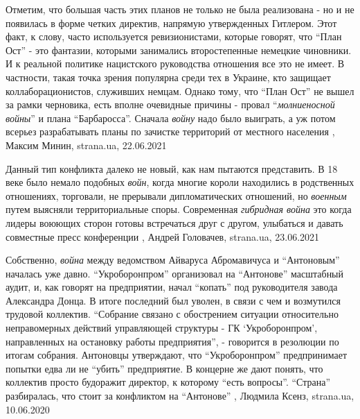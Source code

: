 Отметим, что большая часть этих планов не только не была реализована - но и не
появилась в форме четких директив, напрямую утвержденных Гитлером.  Этот факт,
к слову, часто используется ревизионистами, которые говорят, что \enquote{План Ост} -
это фантазии, которыми занимались второстепенные немецкие чиновники. И к
реальной политике нацистского руководства отношения все это не имеет.  В
частности, такая точка зрения популярна среди тех в Украине, кто защищает
коллаборационистов, служивших немцам.  Однако тому, что \enquote{План Ост} не вышел за
рамки черновика, есть вполне очевидные причины - провал \enquote{\emph{молниеносной войны}} и
плана \enquote{Барбаросса}. Сначала \emph{войну} надо было выиграть, а уж потом всерьез
разрабатывать планы по зачистке территорий от местного населения
 , Максим Минин, strana.ua, 22.06.2021

Данный тип конфликта далеко не новый, как нам пытаются представить.  В 18 веке
было немало подобных \emph{войн}, когда многие короли находились в родственных
отношениях, торговали, не прерывали дипломатических отношений, но \emph{военным} путем
выясняли территориальные споры.  Современная \emph{гибридная война} это когда лидеры
воюющих сторон готовы встречаться друг с другом, улыбаться и давать совместные
пресс конференции
, 
Андрей Головачев, strana.ua, 23.06.2021

Собственно, \emph{война} между ведомством Айваруса Абромавичуса и
\enquote{Антоновым} началась уже давно. \enquote{Укроборонпром} организовал на
\enquote{Антонове} масштабный аудит, и, как говорят на предприятии, начал
\enquote{копать} под руководителя завода Александра Донца. В итоге последний
был уволен, в связи с чем и возмутился трудовой коллектив. \enquote{Собрание
связано с обострением ситуации относительно неправомерных действий управляющей
структуры - ГК \enquote{Укроборонпром}, направленных на остановку работы
предприятия}, - говорится в резолюции по итогам собрания.  Антоновцы
утверждают, что \enquote{Укроборонпром} предпринимает попытки едва ли не
\enquote{убить} предприятие. В концерне же дают понять, что коллектив просто
будоражит директор, к которому \enquote{есть вопросы}.  \enquote{Страна}
разбиралась, что стоит за конфликтом на \enquote{Антонове}
, 
Людмила Ксенз, strana.ua, 10.06.2020

